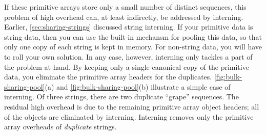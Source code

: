 If these primitive arrays store only a small number of distinct sequences, this
problem of high overhead can, at least indirectly, be addressed by
interning. Earlier, \autoref{sec:sharing-strings} discussed
string interning. If your primitive data is string data, then you can use the
\jres built-in mechansm for pooling this data, so that only one copy of each
string is kept in memory. For non-string data, you will have to roll your own
solution. In any case, however, interning only tackles a part of the problem at
hand. By keeping only a single canonical copy of the primitive data, you
eliminate the primitive array headers for the duplicates.
\autoref{fig:bulk-sharing-pool}(a) and \autoref{fig:bulk-sharing-pool}(b)
illustrate a simple case of interning. Of three strings, there are two duplicate
``grape'' sequences. The residual high overhead is due to the remaining
primitive array object headers; all of the  objects are eliminated
by interning. Interning removes only the primitive array overheads of
\emph{duplicate} strings.


